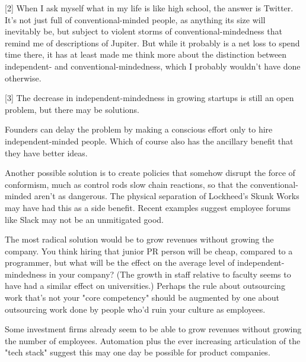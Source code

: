 [2] When I ask myself what in my life is like high school, the
                  answer is Twitter. It's not just full of conventional-minded
                  people, as anything its size will inevitably be, but subject
                  to violent storms of conventional-mindedness that remind me of
                  descriptions of Jupiter. But while it probably is a net loss
                  to spend time there, it has at least made me think more about
                  the distinction between independent- and
                  conventional-mindedness, which I probably wouldn't have done
                  otherwise.

[3] The decrease in independent-mindedness in growing startups
                  is still an open problem, but there may be solutions.

Founders
                  can delay the problem by making a conscious effort only to
                  hire independent-minded people. Which of course also has the
                  ancillary benefit that they have better ideas.

Another
                  possible solution is to create policies that somehow disrupt
                  the force of conformism, much as control rods slow chain
                  reactions, so that the conventional-minded aren't as
                  dangerous. The physical separation of Lockheed's Skunk Works
                  may have had this as a side benefit. Recent examples suggest
                  employee forums like Slack may not be an unmitigated good.

The
                  most radical solution would be to grow revenues without
                  growing the company. You think hiring that junior PR person
                  will be cheap, compared to a programmer, but what will be the
                  effect on the average level of independent-mindedness in your
                  company? (The growth in staff relative to faculty seems to
                  have had a similar effect on universities.) Perhaps the rule
                  about outsourcing work that's not your "core competency"
                  should be augmented by one about outsourcing work done by
                  people who'd ruin your culture as employees.

Some
                  investment firms already seem to be able to grow revenues
                  without growing the number of employees. Automation plus the
                  ever increasing articulation of the "tech stack" suggest this
                  may one day be possible for product companies.


